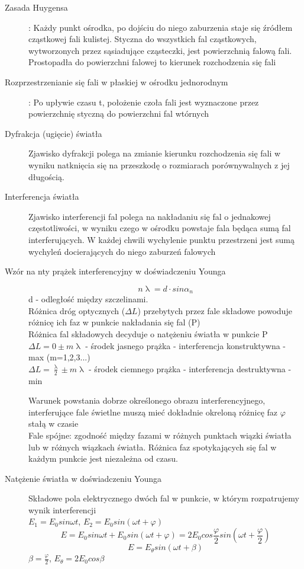 \documentclass[a4paper,11pt]{article}
\begin{document}
\begin{description}
\begin{itemize}
  \end{itemize}
\item[Zasada Huygensa]: Każdy punkt ośrodka, po dojściu do niego zaburzenia staje się źródłem cząstkowej fali kulistej. Styczna do wszystkich fal cząstkowych, wytworzonych przez sąsiadujące cząsteczki, jest powierzchnią falową fali. Prostopadła do powierzchni falowej to kierunek rozchodzenia się fali
\item[Rozprzestrzenianie się fali w płaskiej w ośrodku jednorodnym]: Po upływie czasu t, położenie czoła fali jest wyznaczone przez powierzchnię styczną do powierzchni fal wtórnych
\item[Dyfrakcja (ugięcie) światła] Zjawisko dyfrakcji polega na zmianie kierunku rozchodzenia się fali w wyniku natknięcia się na przeszkodę o rozmiarach porównywalnych z jej długością.
\item[Interferencja światła] Zjawisko interferencji fal polega na nakładaniu się fal o jednakowej częstotliwości, w wyniku czego w ośrodku powstaje fala będąca sumą fal interferujących. W każdej chwili wychylenie punktu przestrzeni jest sumą wychyleń docierających do niego zaburzeń falowych
\item[Wzór na nty prążek interferencyjny w doświadczeniu Younga]
  $$n\uplambda = d\cdot sin\alpha_n$$
  d - odległość między szczelinami. \\
  Różnica dróg optycznych ($\Delta L$) przebytych przez fale składowe powoduje różnicę ich faz w punkcie nakładania się fal (P)\\
  Różnica fal składowych decyduje o natężeniu światła w punkcie P\\
  $\Delta L = 0 \pm m\uplambda$ - środek jasnego prążka - interferencja konstruktywna - max (m=1,2,3...)\\
  $\Delta L = \frac{\uplambda}{2} \pm m\uplambda$ - środek ciemnego prążka - interferencja destruktywna - min
  
  Warunek powstania dobrze określonego obrazu interferencyjnego, interferujące fale świetlne muszą mieć dokładnie okreloną różnicę faz $\varphi$ stałą w czasie\\
  Fale spójne: zgodność między fazami w różnych punktach wiązki światła lub w różnych wiązkach światła. Różnica faz spotykających się fal w każdym punkcie jest niezależna od czasu. \\
\item[Natężenie światła w doświadczeniu Younga] Składowe pola elektrycznego dwóch fal w punkcie, w którym rozpatrujemy wynik interferencji\\
  $E_1 = E_0sin\omega t$, $E_2=E_0sin\left(\omega t + \varphi\right)$
  $$E = E_0sin\omega t + E_0sin\left(\omega t + \varphi\right) = 2E_0cos\frac{\varphi}{2}sin\left(\omega t + \frac{\varphi}{2}\right)$$
  $$E = E_\theta sin\left(\omega t +\beta\right)$$
  $\beta = \frac{\varphi}{2}$, $E_\theta=2E_0cos\beta$


\end{description}
\end{document}
